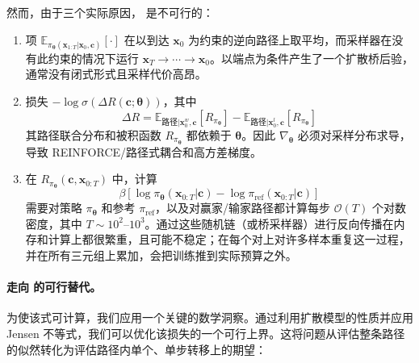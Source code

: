 然而，由于三个实际原因， 是不可行的：
\begin{enumerate}[leftmargin=*]
\item {}
项 $\mathbb E_{\pi_{\bm\theta}(\mathbf x_{1:T}|\mathbf x_0,\mathbf c)}[\cdot]$ 在以到达 $\mathbf x_0$ 为约束的逆向路径上取平均，而采样器在没有此约束的情况下运行 $\mathbf x_T \to \cdots \to \mathbf x_0$。以端点为条件产生了一个扩散桥后验，通常没有闭式形式且采样代价高昂。

\item {}
损失 $-\log\sigma(\Delta R(\mathbf c;\bm\theta))$，其中
\[
\Delta R=\mathbb E_{\text{路径}|\mathbf x_0^w,\mathbf c}[R_{\pi_{\bm\theta}}]
-\mathbb E_{\text{路径}|\mathbf x_0^l,\mathbf c}[R_{\pi_{\bm\theta}}]
\]
其路径联合分布和被积函数 $R_{\pi_{\bm\theta}}$ 都依赖于 $\bm\theta$。因此 $\nabla_{\bm\theta}$ 必须对采样分布求导，导致 REINFORCE/路径式耦合和高方差梯度。

\item {}
在 $R_{\pi_{\bm\theta}}(\mathbf c,\mathbf x_{0:T})$ 中，计算
\[
\beta \left[\log \pi_{\bm\theta}(\mathbf x_{0:T}|\mathbf c)
-\log \pi_{\mathrm{ref}}(\mathbf x_{0:T}|\mathbf c)\right]
\]
需要对策略 $\pi_{\bm\theta}$ 和参考 $\pi_{\mathrm{ref}}$，以及对赢家/输家路径都计算每步 $\mathcal O(T)$ 个对数密度，其中 $T \sim 10^2$–$10^3$。通过这些随机链（或桥采样器）进行反向传播在内存和计算上都很繁重，且可能不稳定；在每个对上对许多样本重复这一过程，并在所有三元组上累加，会把训练推到实际预算之外。
\end{enumerate}

\paragraph{走向  的可行替代。}
为使该式可计算，我们应用一个关键的数学洞察。通过利用扩散模型的性质并应用 Jensen 不等式，我们可以优化该损失的一个可行上界。这将问题从评估整条路径的似然转化为评估路径内单个、单步转移上的期望：

